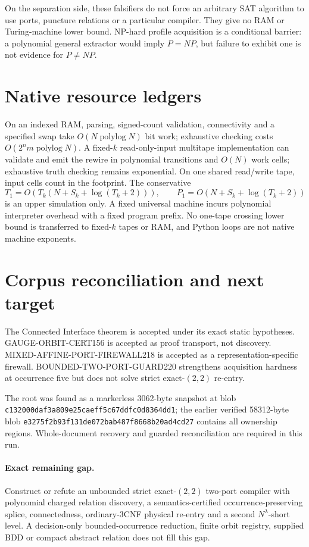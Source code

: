 \documentclass[11pt]{article}
\begin{document}
On the separation side, these falsifiers do not force an arbitrary SAT
algorithm to use ports, puncture relations or a particular compiler. They give
no RAM or Turing-machine lower bound. NP-hard profile acquisition is a
conditional barrier: a polynomial general extractor would imply $P=NP$, but
failure to exhibit one is not evidence for $P\ne NP$.

\section{Native resource ledgers}
On an indexed RAM, parsing, signed-count validation, connectivity and a
specified swap take $O(N\operatorname{polylog}N)$ bit work; exhaustive
checking costs $O(2^n m\operatorname{polylog}N)$. A fixed-$k$
read-only-input multitape implementation can validate and emit the rewire in
polynomial transitions and $O(N)$ work cells; exhaustive truth checking
remains exponential. On one shared read/write tape, input cells count in the
footprint. The conservative
\[
T_1=O(T_k(N+S_k+\log(T_k+2))),\qquad
P_1=O(N+S_k+\log(T_k+2))
\]
is an upper simulation only. A fixed universal machine incurs polynomial
interpreter overhead with a fixed program prefix. No one-tape crossing lower
bound is transferred to fixed-$k$ tapes or RAM, and Python loops are not native
machine exponents.

\section{Corpus reconciliation and next target}
The Connected Interface theorem is accepted under its exact static hypotheses.
GAUGE-ORBIT-CERT156 is accepted as proof transport, not discovery.
MIXED-AFFINE-PORT-FIREWALL218 is accepted as a representation-specific
firewall. BOUNDED-TWO-PORT-GUARD220 strengthens acquisition hardness at
occurrence five but does not solve strict exact-$(2,2)$ re-entry.

The root was found as a markerless 3062-byte snapshot at blob
\texttt{c132000daf3a809e25caeff5c67ddfc0d8364dd1}; the earlier verified
58312-byte blob \texttt{e3275f2b93f131de072bab487f8668b20ad4cd27}
contains all ownership regions. Whole-document recovery and guarded
reconciliation are required in this run.

\paragraph{Exact remaining gap.}
Construct or refute an unbounded strict exact-$(2,2)$ two-port compiler with
polynomial charged relation discovery, a semantics-certified
occurrence-preserving splice, connectedness, ordinary-3CNF physical re-entry
and a second $N^\lambda$-short level. A decision-only bounded-occurrence
reduction, finite orbit registry, supplied BDD or compact abstract relation
does not fill this gap.
\end{document}
